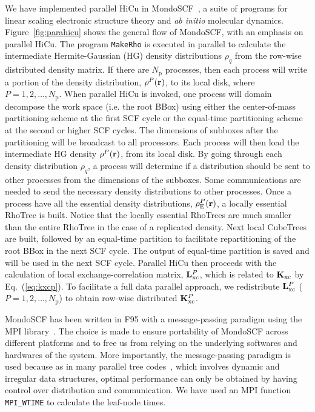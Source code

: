 \documentclass[preprint]{revtex4}
\newcommand{\Kxc}{{\bf K}_{\mathrm{xc}}}
\newcommand{\Np}{N_{\mathrm{p}}} \newcommand{\Nbox}{N_{\mathrm{b}}}
\begin{document}
We have implemented parallel HiCu in MondoSCF~\cite{Mondo}, a suite of
programs for linear scaling electronic structure theory and {\it ab
initio}\/ molecular dynamics.  Figure~\ref{fig:parahicu} shows the
general flow of MondoSCF, with an emphasis on parallel HiCu.  The
program {\tt MakeRho} is executed in parallel to calculate the
intermediate Hermite-Gaussian (HG) density distributions $\rho_q$ from
the row-wise distributed density matrix. If there are $\Np$ processes, 
then each process
will write a portion of the density distribution, $\rho^{P}({\bf
r})$, to its local disk, where $ P = 1, 2, \ldots, \Np$. When parallel
HiCu is invoked, one process will domain decompose the work space
(i.e. the root BBox) using either the center-of-mass partitioning
scheme at the first SCF cycle or the equal-time partitioning scheme at the
second or higher SCF cycles. The dimensions of subboxes after the
partitioning will be broadcast to all processors. Each process will
then load the intermediate HG density $\rho^{P}({\bf r})$,
from its local disk.  By going
through each density distribution $\rho_q$, a process will determine if a
distribution should be sent to other processes from the dimensions of
the subboxes. Some communications are needed to send the
necessary density distributions to other processes. Once a process
have all the essential density distributions, $\rho_{\mathrm{E}}^{P}({\bf r})$, 
a locally essential RhoTree is built.  Notice
that the locally essential RhoTrees are much smaller than the entire RhoTree in
the case of a replicated density.  Next local CubeTrees are built,
followed by an equal-time partition to facilitate repartitioning of
the root BBox in the next SCF cycle. The output of equal-time
partition is saved and will be used in the next SCF cycle.  Parallel
HiCu then proceeds with the calculation of local exchange-correlation
matrix, ${\bf L}_{\mathrm{xc}}^{P}$, which is related to $\Kxc$ by
Eq.~(\ref{eq:kxcp}).  To facilitate a full data parallel approach, we
redistribute ${\bf L}_{\mathrm{xc}}^{P}$ ($P = 1, 2, \ldots,\Np$) to
obtain row-wise distributed ${\bf K}_{\mathrm{xc}}^{P}$.

MondoSCF has been written in F95 with a message-passing paradigm using
the MPI library~\cite{mpi}.  The choice is made to ensure portability
of MondoSCF across different platforms and to free us from relying on
the underlying softwares and hardwares of the system.  More
importantly, the message-passing paradigm is used because as in many
parallel tree codes~\cite{Warren95b}, which involves dynamic and
irregular data structures, optimal performance can only be obtained by
having control over distribution and communication. We have used an
MPI function {\tt MPI\_WTIME} to calculate the leaf-node times.
\end{document}
